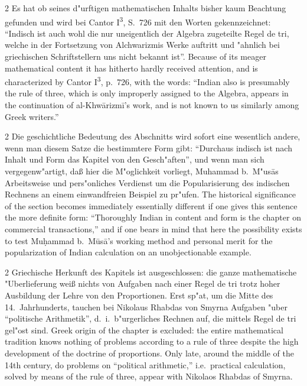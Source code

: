 \documentclass[10pt,a4paper]{article}
\renewcommand{\switchcolumn}{\syncronize\nointerlineskip\columnbreak}
\newcommand{\enquote}[1]{``#1''}
\begin{document}
\begin{paracol}{2}
Es hat ob seines d"urftigen mathematischen Inhalts bisher kaum Beachtung gefunden und wird bei Cantor I\textsuperscript{3}, S.\ 726 mit den Worten gekennzeichnet: \enquote{Indisch ist auch wohl die nur uneigentlich der Algebra zugeteilte Regel de tri, welche in der Fortsetzung von Alchwarizmis Werke auftritt und "ahnlich bei griechischen Schriftstellern uns nicht bekannt ist}.
\switchcolumn
Because of its meager mathematical content it has hitherto hardly received attention, and is characterized by Cantor I\textsuperscript{3}, p.\ 726, with the words: ``Indian also is presumably the rule of three, which is only improperly assigned to the Algebra, appears in the continuation of al-Khw\=arizm\={i}'s work, and is not known to us similarly among Greek writers.''
\end{paracol}

\begin{paracol}{2}
Die geschichtliche Bedeutung des Abschnitts wird sofort eine wesentlich andere, wenn man diesem Satze die bestimmtere Form gibt: \enquote{Durchaus indisch ist nach Inhalt und Form das Kapitel von den Gesch"aften}, und wenn man sich vergegenw"artigt, da\ss{} hier die M"oglichkeit vorliegt, Muhammad b.\ M"us\=as Arbeitsweise und pers"onliches Verdienst um die Popularisierung des indischen Rechnens an einem einwandfreien Beispiel zu pr"ufen.
\switchcolumn
The historical significance of the section becomes immediately essentially different if one gives this sentence the more definite form: ``Thoroughly Indian in content and form is the chapter on commercial transactions,'' and if one bears in mind that here the possibility exists to test Mu\d{h}ammad b.\ M\=us\=a's working method and personal merit for the popularization of Indian calculation on an unobjectionable example.
\end{paracol}

\begin{paracol}{2}
Griechische Herkunft des Kapitels ist ausgeschlossen: die ganze mathematische "Uberlieferung wei\ss{} nichts von Aufgaben nach einer Regel de tri trotz hoher Ausbildung der Lehre von den Proportionen. Erst sp"at, um die Mitte des 14.\ Jahrhunderts, tauchen bei Nikolaus Rhabdas von Smyrna Aufgaben "uber \enquote{politische Arithmetik}, d.\ i.\ b"urgerliches Rechnen auf, die mittels Regel de tri gel"ost sind.
\switchcolumn
Greek origin of the chapter is excluded: the entire mathematical tradition knows nothing of problems according to a rule of three despite the high development of the doctrine of proportions. Only late, around the middle of the 14th century, do problems on ``political arithmetic,'' i.e.\ practical calculation, solved by means of the rule of three, appear with Nikolaos Rhabdas of Smyrna.
\end{paracol}
\end{document}
